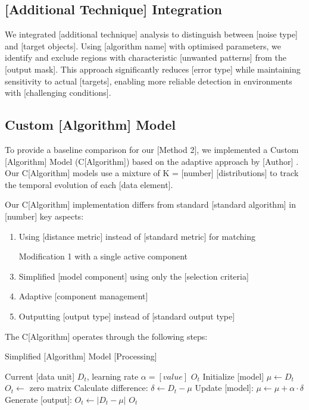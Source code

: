 \subsection{[Additional Technique] Integration}

We integrated [additional technique] analysis to distinguish between [noise type] and [target objects]. Using [algorithm name] \cite{ravikumar2016optical} with optimised parameters, we identify and exclude regions with characteristic [unwanted patterns] from the [output mask]. This approach significantly reduces [error type] while maintaining sensitivity to actual [targets], enabling more reliable detection in environments with [challenging conditions].

\subsection{Custom [Algorithm] Model}

To provide a baseline comparison for our [Method 2], we implemented a Custom [Algorithm] Model (C[Algorithm]) based on the adaptive approach by [Author] \cite{ravikumar2016optical}. Our C[Algorithm] models use a mixture of K = [number] [distributions] to track the temporal evolution of each [data element].

Our C[Algorithm] implementation differs from standard [standard algorithm] in [number] key aspects:
\begin{enumerate}
\item Using [distance metric] instead of [standard metric] for matching
\item [Modification 1] with a single active component
\item Simplified [model component] using only the [selection criteria]
\item Adaptive [component management]
\item Outputting [output type] instead of [standard output type]
\end{enumerate}

The C[Algorithm] operates through the following steps:

\begin{algorithm}[!ht]
\caption{Simplified [Algorithm] Model [Processing]}
\label{alg:custom_algorithm}
\begin{algorithmic}[1]
\REQUIRE Current [data unit] $D_t$, learning rate $\alpha=[value]$
\ENSURE [Output] $O_t$
    \STATE Initialize [model] $\mu \leftarrow D_t$
    \STATE $O_t \leftarrow$ zero matrix
\ELSE
    \STATE Calculate difference: $\delta \leftarrow D_t - \mu$
    \STATE Update [model]: $\mu \leftarrow \mu + \alpha \cdot \delta$
    \STATE Generate [output]: $O_t \leftarrow |D_t - \mu|$
\ENDIF
\RETURN $O_t$
\end{algorithmic}
\end{algorithm}

